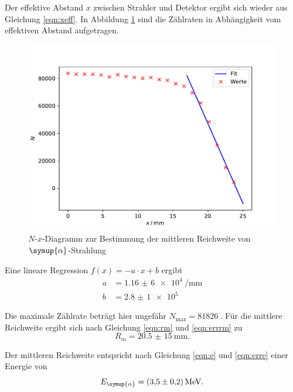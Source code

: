 Der effektive Abstand $x$ zwischen Strahler und Detektor ergibt sich wieder aus Gleichung \eqref{eqn:xeff}.
In Abbildung \ref{fig:reich24mm} sind die Zählraten in Abhängigkeit vom effektiven Abstand aufgetragen.
\begin{figure}[H]
  \centering
  \includegraphics[width=\textwidth]{Plots/reich24mm.pdf}
  \caption{$N$-$x$-Diagramm zur Bestimmung der mittleren Reichweite von $\symup{\alpha}$-Strahlung}
  \label{fig:reich24mm}
\end{figure}

Eine lineare Regression $f(x) = -a \cdot x + b$ ergibt
\begin{align*}
  a &= \SI{1,16(6)e4}{\per \mm} \\
  b &= \SI{2,8(1)e5}{}
\end{align*}

Die maximale Zählrate beträgt hier ungefähr $N_\text{max} = \SI{81826}{}$. Für die mittlere Reichweite ergibt sich nach Gleichung \eqref{eqn:rm} und \eqref{eqn:errrm} zu
\begin{equation*}
  R_m = \SI{20,5(15)}{\mm}.
\end{equation*}

Der mittleren Reichweite entspricht nach Gleichung \eqref{eqn:e} und \eqref{eqn:erre} einer Energie von
\begin{equation*}
  E_{\symup{\alpha}} = \SI{3,5(2)}{\MeV}.
\end{equation*}

